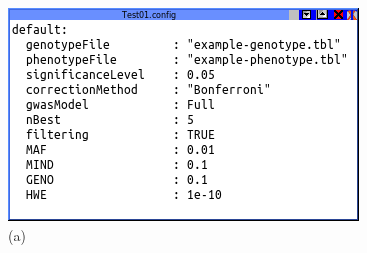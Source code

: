 \documentclass{article}
\begin{document}
\begin{figure}[H]
\begin{centering}
\begin{minipage}[t][1\totalheight][c]{0.5\columnwidth}%
\begin{center}
\includegraphics[scale=0.5]{images/screenshot-configFile}\\
(a)
\par\end{center}%
\end{minipage}
\par\end{centering}
~


\end{figure}
\end{document}
